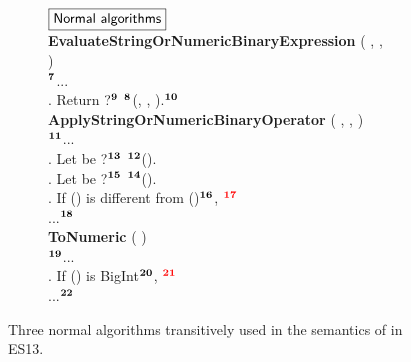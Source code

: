 \begin{figure}
  \centering
  \begin{subfigure}{\textwidth}
    \small
    $\fbox{\textsf{Normal algorithms}}$
    \vspace*{0.5em}\\
    \textbf{EvaluateStringOrNumericBinaryExpression} (
      ,
      ,
    )
    \\
    \null\quad ${}^{\textbf{7}}$...
    \\
    \null{}. Return ?${}^{\textbf{9}}$
    ${}^{\textbf{8}}$(,
    , ).${}^{\textbf{10}}$
    \vspace*{0.5em}\\
    \textbf{ApplyStringOrNumericBinaryOperator} (
      ,
      ,
    )
    \\
    \null\quad ${}^{\textbf{11}}$...
    \\
    \null{}. Let  be ?${}^{\textbf{13}}$
    ${}^{\textbf{12}}$().
    \\
    \null{}. Let  be ?${}^{\textbf{15}}$
    ${}^{\textbf{14}}$().
    \\
    \null{}. If () is different from
    ()${}^{\textbf{16}}$, ${}^{\textbf{{\color{red}{17}}}}$
    \\
    \null\quad ...${}^{\textbf{18}}$
    \vspace*{0.5em}\\
    \textbf{ToNumeric} (  )
    \\
    \null\quad ${}^{\textbf{19}}$...
    \\
    \null{}. If () is BigInt${}^{\textbf{20}}$,
    ${}^{\textbf{{\color{red}{21}}}}$
    \\
    \null\quad ...${}^{\textbf{22}}$
  \end{subfigure}
  \caption{Three normal algorithms transitively used in the semantics of
   in ES13.}
  \label{fig:normal-algos}
  \vspace*{-1em}
\end{figure}


